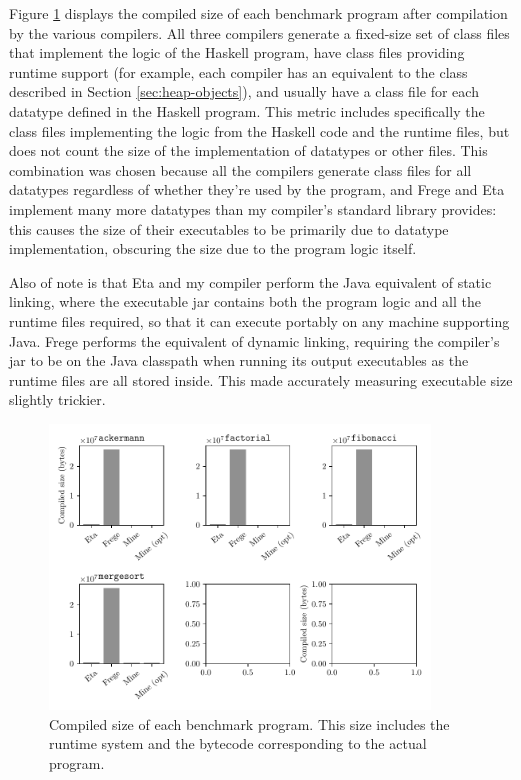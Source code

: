 \documentclass[dissertation.tex]{subfiles}
\begin{document}
{{        Figure \ref{fig:executable-size} displays the compiled size of each benchmark program after compilation by the various compilers. All three compilers generate a fixed-size set of class files that implement the logic of the Haskell program, have class files providing runtime support (for example, each compiler has an equivalent to the  class described in Section \ref{sec:heap-objects}), and usually have a class file for each datatype defined in the Haskell program. This metric includes specifically the class files implementing the logic from the Haskell code and the runtime files, but does not count the size of the implementation of datatypes or other files. This combination was chosen because all the compilers generate class files for all datatypes regardless of whether they're used by the program, and Frege and Eta implement many more datatypes than my compiler's standard library provides: this causes the size of their executables to be primarily due to datatype implementation, obscuring the size due to the program logic itself.

        Also of note is that Eta and my compiler perform the Java equivalent of static linking, where the executable jar contains both the program logic and all the runtime files required, so that it can execute portably on any machine supporting Java. Frege performs the equivalent of dynamic linking, requiring the compiler's jar to be on the Java classpath when running its output executables as the runtime files are all stored inside. This made accurately measuring executable size slightly trickier.

        \begin{figure}[H]
            \centering
            \captionsetup{width=0.8\textwidth}
            \includegraphics[width=0.9\textwidth]{graphs/size.pdf}
            \caption{Compiled size of each benchmark program. This size includes the runtime system and the bytecode corresponding to the actual program.}
            \label{fig:executable-size}
        \end{figure}
    }
}
\end{document}
